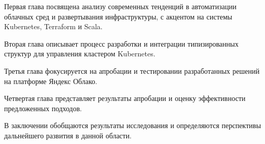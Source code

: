 Первая глава посвящена анализу современных тенденций в автоматизации облачных
сред и развертывания инфраструктуры, с акцентом на системы Kubernetes, Terraform
и Scala.

Вторая глава описывает процесс разработки и интеграции типизированных структур
для управления кластером Kubernetes.

Третья глава фокусируется на апробации и тестировании разработанных решений на
платформе Яндекс Облако.

Четвертая глава представляет результаты апробации и оценку эффективности
предложенных подходов.

В заключении обобщаются результаты исследования и определяются перспективы
дальнейшего развития в данной области.
